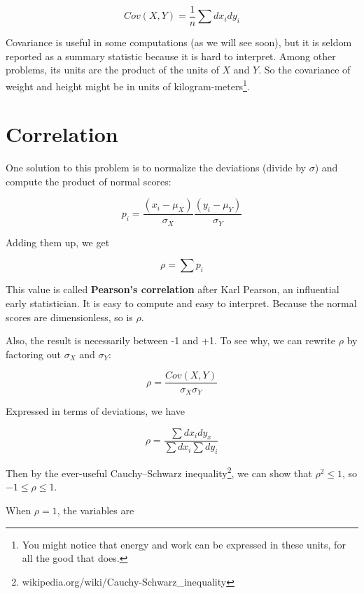 \documentclass[12pt]{book}
\begin{document}
\[ Cov(X,Y) = \frac{1}{n} \sum dx_i dy_i \]

Covariance is useful in some computations (as we will see soon), but
it is seldom reported as a summary statistic because it is hard to
interpret.  Among other problems, its units are the product of the
units of $X$ and $Y$.  So the covariance of weight and height might be
in units of kilogram-meters\footnote{You might notice that energy and
  work can be expressed in these units, for all the good that
  does.}.


\section{Correlation}

One solution to this problem is to normalize the deviations (divide by
$\sigma$) and compute the product of normal scores:

\[ p_i = \frac{(x_i - \mu_X)}{\sigma_X} \frac{(y_i - \mu_Y)}{\sigma_Y} \]

Adding them up, we get 

\[ \rho = \sum p_i \]

This value is called {\bf Pearson's correlation} after Karl Pearson,
an influential early statistician.  It is easy to compute and easy to
interpret.  Because the normal scores are dimensionless, so is $\rho$.

Also, the result is necessarily between -1 and +1.  To see why, we
can rewrite $\rho$ by factoring out $\sigma_X$ and $\sigma_Y$:

\[ \rho = \frac{Cov(X,Y)}{\sigma_X \sigma_Y} \]

Expressed in terms of deviations, we have

\[ \rho = \frac{\sum dx_i dy_x}{\sum dx_i \sum dy_i} \]

Then by the ever-useful Cauchy–Schwarz
inequality\footnote{wikipedia.org/wiki/Cauchy-Schwarz\_inequality}, we
can show that $\rho^2 \le 1$, so $-1 \le \rho \le 1$.

When $\rho=1$, the variables are 
\end{document}
